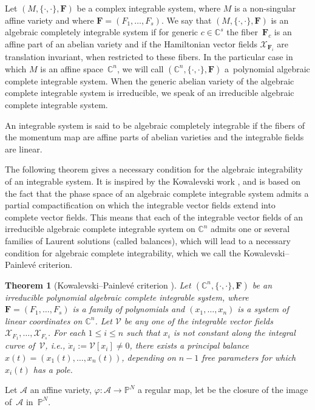 \documentclass[10pt,a4paper]{amsart}
\numberwithin{equation}{section}
\newtheorem{Theorem}{Theorem}[section]
\begin{document}
\begin{Definition}
Let $(M,\{\cdot,\cdot\}, \mathbf{F})$ be a complex
integrable system, where $M$ is a non-singular affine variety and
where $\mathbf{F}=(F_1,\dots,F_s)$. We say that
$(M,\{\cdot,\cdot\}, \mathbf{F})$ is an algebraic completely integrable system if for generic $c
\in \mathbb{C}^s$ the fiber~$\mathbf{F}_c$ is an affine part of
an abelian variety and if the Hamiltonian vector fields
$\mathcal{X}_{\mathbf{F}_i } $ are translation invariant, when
restricted to these fibers. In the particular case in which $M$ is
an affine space~$\mathbb{C}^n$, we will call
$(\mathbb{C}^n,\{\cdot,\cdot\}, \mathbf{F})$ a~polynomial algebraic complete integrable system. When the generic abelian variety of the
algebraic complete integrable system is irreducible, we speak of an irreducible algebraic complete integrable
system.
\end{Definition}

 An integrable system is said to be algebraic completely integrable
if the fibers of the momentum map are affine parts of abelian varieties and the integrable fields are linear.

The following theorem gives a necessary condition for the algebraic
integrability of an integrable system. It is inspired by the
Kowalevski work \cite{Kowaleski}, and is based on the fact that the
phase space of an algebraic complete integrable system admits a partial compactification on
which the integrable vector fields extend into complete vector
fields. This means that each of the integrable vector fields of an
irreducible algebraic complete integrable system on $\mathbb{C}^n$ admits one or several
families of Laurent solutions (called balances), which will lead to
a necessary condition for algebraic complete integrability, which we
call the Kowalevski--Painlev\'e criterion.

\begin{Theorem}[Kowalevski--Painlev\'e criterion {\cite{al_Moer3}}]
Let $ (\mathbb{C}^n,\{\cdot,\cdot\}, \mathbf{F} )$ be an
irreducible polynomial algebraic complete integrable system, where
$\mathbf{F}= (F_1,\dots,F_s )$ is a family of polynomials
and $ (x_1,\dots,x_n )$ is a system of linear
coordinates on $\mathbb{C}^n$. Let $\mathcal{V}$ be any one of
the integrable vector fields
$\mathcal{X}_{F_1},\dots,\mathcal{X}_{F_s}$. For each $1\leq i
\leq n$ such that $x_i$ is not constant along the integral curve
of~$\mathcal{V}$, i.e., $\dot{x}_i:=\mathcal{V}[x_i]\neq 0$,
there exists a principal balance
$x (t )= (x_1 (t ), \dots,
x_n (t ) )$, depending on $n-1$ free parameters
for which $x_i (t )$ has a pole.
\end{Theorem}
Let $\mathcal{A}$ an affine variety,
$\varphi\colon \mathcal{A}\longrightarrow \mathbb{P}^N$ a regular map,
 let  be the closure of the
image of~$\mathcal{A}$ in~$\mathbb{P}^N$.
\end{document}
